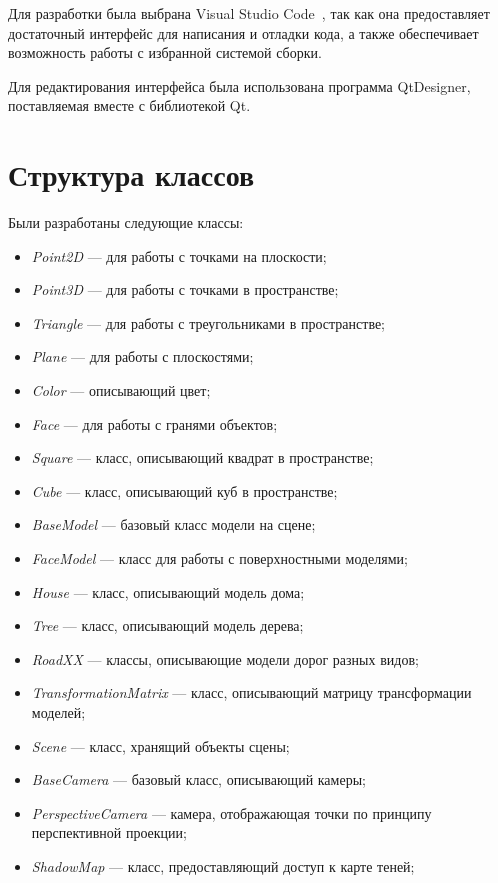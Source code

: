 Для разработки была выбрана Visual Studio Code~\cite{vscode}, так как она предоставляет достаточный интерфейс для написания и отладки кода, а также обеспечивает возможность работы с избранной системой сборки.

Для редактирования интерфейса была использована программа QtDesigner, поставляемая вместе с библиотекой Qt.

\section{Структура классов}

Были разработаны следующие классы:
\begin{itemize}
  \item \emph{Point2D} --- для работы с точками на плоскости;
  \item \emph{Point3D} --- для работы с точками в пространстве;
  \item \emph{Triangle} --- для работы с треугольниками в пространстве;
  \item \emph{Plane} --- для работы с плоскостями;
  \item \emph{Color} --- описывающий цвет;
  \item \emph{Face} --- для работы с гранями объектов;
  \item \emph{Square} --- класс, описывающий квадрат в пространстве;
  \item \emph{Cube} --- класс, описывающий куб в пространстве;
  \item \emph{BaseModel} --- базовый класс модели на сцене;
  \item \emph{FaceModel} --- класс для работы с поверхностными моделями;
  \item \emph{House} --- класс, описывающий модель дома;
  \item \emph{Tree} --- класс, описывающий модель дерева;
  \item \emph{RoadXX} --- классы, описывающие модели дорог разных видов;
  \item \emph{TransformationMatrix} --- класс, описывающий матрицу трансформации моделей;
  \item \emph{Scene} --- класс, хранящий объекты сцены;
  \item \emph{BaseCamera} --- базовый класс, описывающий камеры;
  \item \emph{PerspectiveCamera} --- камера, отображающая точки по принципу перспективной проекции;
  \item \emph{ShadowMap} --- класс, предоставляющий доступ к карте теней;

\end{itemize}
